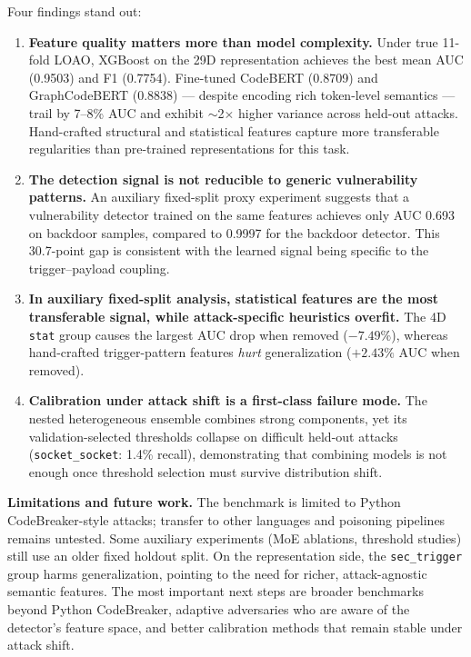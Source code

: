 ﻿\documentclass[sigconf,review,anonymous]{acmart}
\begin{document}
Four findings stand out:

\begin{enumerate}
\item \textbf{Feature quality matters more than model complexity.}
  Under true 11-fold LOAO, XGBoost on the 29D representation achieves the best
  mean AUC (0.9503) and F1 (0.7754). Fine-tuned CodeBERT (0.8709) and
  GraphCodeBERT (0.8838) --- despite encoding rich token-level semantics ---
  trail by 7--8\% AUC and exhibit $\sim$2$\times$ higher variance across
  held-out attacks. Hand-crafted structural and statistical features capture
  more transferable regularities than pre-trained representations for this task.

\item \textbf{The detection signal is not reducible to generic vulnerability
  patterns.}
  An auxiliary fixed-split proxy experiment suggests that a vulnerability
  detector trained on the same features achieves only AUC 0.693 on backdoor
  samples, compared to 0.9997 for the backdoor detector. This 30.7-point gap is
  consistent with the learned signal being specific to the trigger--payload
  coupling.

\item \textbf{In auxiliary fixed-split analysis, statistical features are the
  most transferable signal, while attack-specific heuristics overfit.}
  The 4D \texttt{stat} group causes the largest AUC drop when removed
  ($-7.49\%$), whereas hand-crafted trigger-pattern features \emph{hurt}
  generalization ($+2.43\%$ AUC when removed).

\item \textbf{Calibration under attack shift is a first-class failure mode.}
  The nested heterogeneous ensemble combines strong components, yet its
  validation-selected thresholds collapse on difficult held-out attacks
  (\texttt{socket\_socket}: 1.4\% recall), demonstrating that combining
  models is not enough once threshold selection must survive distribution
  shift.
\end{enumerate}

\noindent\textbf{Limitations and future work.}
The benchmark is limited to Python CodeBreaker-style attacks; transfer to
other languages and poisoning pipelines remains untested.
Some auxiliary experiments (MoE ablations, threshold studies) still use an older
fixed holdout split.
On the representation side, the \texttt{sec\_trigger} group harms
generalization, pointing to the need for richer, attack-agnostic semantic
features.
The most important next steps are broader benchmarks beyond Python CodeBreaker,
adaptive adversaries who are aware of the detector's feature space, and better
calibration methods that remain stable under attack shift.


\end{document}
